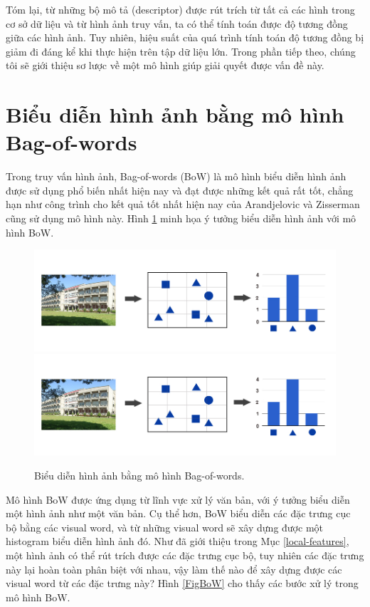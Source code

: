 Tóm lại, từ những bộ mô tả (descriptor) được rút trích từ tất cả các hình trong cơ sở dữ liệu và từ hình ảnh truy vấn, ta có thể tính toán được độ tương đồng giữa các hình ảnh. Tuy nhiên, hiệu suất của quá trình tính toán độ tương đồng bị giảm đi đáng kể khi thực hiện trên tập dữ liệu lớn. Trong phần tiếp theo, chúng tôi sẽ giới thiệu sơ lược về một mô hình giúp giải quyết được vấn đề này.

\section{Biểu diễn hình ảnh bằng mô hình Bag-of-words}
\label{bag-of-words}
Trong truy vấn hình ảnh, Bag-of-words (BoW) là mô hình biểu diễn hình ảnh được sử dụng phổ biến nhất hiện nay và đạt được những kết quả rất tốt, chẳng hạn như công trình cho kết quả tốt nhất hiện nay của Arandjelovic và Zisserman\cite{arandjelovic2012three} cũng sử dụng mô hình này. Hình \ref{FigBoWPreview} minh họa ý tưởng biểu diễn hình ảnh với mô hình BoW.

\begin{figure}[!htbp]
  \begin{center}
    \leavevmode
    \ifpdf
      \includegraphics[scale=0.45]{bow-preview}
    \else
      \includegraphics[scale=0.45]{bow-preview}
    \fi
    \caption[Biểu diễn hình ảnh bằng mô hình Bag-of-words]{Biểu diễn hình ảnh bằng mô hình Bag-of-words.}
    \label{FigBoWPreview}
  \end{center}
\end{figure}

Mô hình BoW được ứng dụng từ lĩnh vực xử lý văn bản, với ý tưởng biểu diễn một hình ảnh như một văn bản. Cụ thể hơn, BoW biểu diễn các đặc trưng cục bộ bằng các visual word, và từ những visual word sẽ xây dựng được một histogram biểu diễn hình ảnh đó. Như đã giới thiệu trong Mục \ref{local-features}, một hình ảnh có thể rút trích được các đặc trưng cục bộ, tuy nhiên các đặc trưng này lại hoàn toàn phân biệt với nhau, vậy làm thế nào để xây dựng được các visual word từ các đặc trưng này? Hình \ref{FigBoW} cho thấy các bước xử lý trong mô hình BoW.

